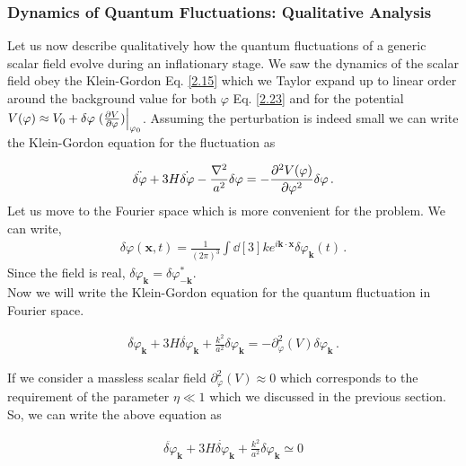 \subsubsection{Dynamics of Quantum Fluctuations: Qualitative Analysis}

 \hspace{0.5cm} Let us now describe qualitatively how the quantum fluctuations of a generic scalar field evolve during an inflationary stage. We saw the dynamics of the scalar field obey the Klein-Gordon Eq. \ref{2.15} which we Taylor expand up to linear order around the background value for both $\varphi$ Eq. \ref{2.23} and for the potential \(V(\varphi ) \approx V_0 + \delta \varphi \eval{(\pdv{V}{\varphi })}_{\varphi_0 }\). Assuming the perturbation is indeed small we can write the Klein-Gordon equation for the fluctuation as

\begin{align} 
    \ddot{ \delta \varphi} + 3 H \dot{\delta \varphi} - \frac{\nabla^2}{a^2} \delta \varphi = - \pdv[2]{V(\varphi )}{\varphi } \delta \varphi \,. \label{2.49}
\end{align}
Let us move to the Fourier space which is more convenient for the problem. We can write,
\begin{align}
    \delta \varphi (\mathbf{x}, t) = \frac{1}{(2\pi )^{3}} \int \dd[3]{k} 
    e^{i \mathbf{k} \cdot \mathbf{x}} \delta \varphi _{\mathbf{k}}(t)
    \,.\label{2.50}
\end{align}
Since the field is real, \(\delta \varphi _{\mathbf{k}} = \delta \varphi _{- \mathbf{k}}^{*}\).\\
Now we will write the Klein-Gordon equation for the quantum fluctuation in Fourier space.

\begin{align}
    \ddot{ \delta \varphi} _{\mathbf{k}} + 3 H \dot{ \delta \varphi}_{\mathbf{k}} + \frac{k^2}{a^2} \delta \varphi _{\mathbf{k}} = - \partial_{\varphi}^2(V) \delta \varphi _{\mathbf{k}}\,.\label{2.51}
\end{align}

If we consider a massless scalar field $\partial_{\varphi}^2(V) \approx 0$ which corresponds to the requirement of the parameter $\eta \ll 1$ which we discussed in the previous section. So, we can write the above equation as

\begin{align}
    \ddot{ \delta \varphi} _{\mathbf{k}} + 3 H \dot{ \delta \varphi}_{\mathbf{k}} + \frac{k^2}{a^2} \delta \varphi _{\mathbf{k}} \simeq 0 \label{2.52}
\end{align}\\

